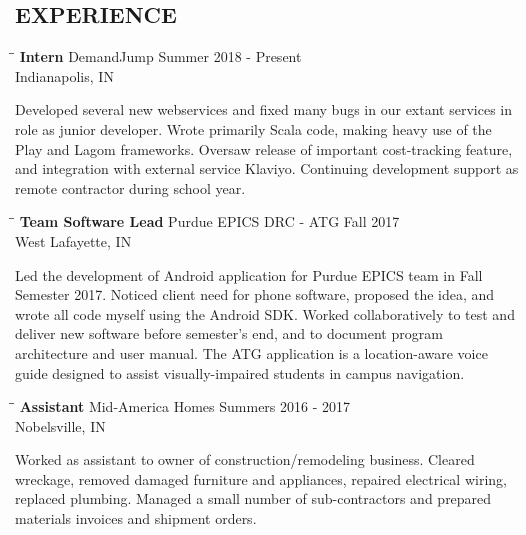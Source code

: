 \documentclass[10pt]{res}
\begin{document}
\begin{resume}
\vspace{-20pt}\section{EXPERIENCE}
   \vspace{-0.1in}	
	\begin{tabbing}
   \hspace{2.3in}\= \hspace{2.6in}\= \kill %
    {\bf Intern} \>DemandJump \>Summer 2018 - Present \\
                             \>Indianapolis, IN
   \end{tabbing}\vspace{-20pt}      %
  Developed several new webservices and fixed many bugs in our extant services in role as junior
  developer. Wrote primarily Scala code, making heavy use of the Play and Lagom frameworks. Oversaw release of important cost-tracking feature, and integration with external service
  Klaviyo. Continuing development support as remote contractor during school year.
  \vspace{-10pt}\begin{tabbing}
   \hspace{2.3in}\= \hspace{2.6in}\= \kill %
    {\bf Team Software Lead} \>Purdue EPICS DRC - ATG \>Fall 2017 \\
                             \>West Lafayette, IN
   \end{tabbing}\vspace{-20pt}      %
	Led the development of Android application for Purdue EPICS team in Fall Semester 2017. Noticed client need for phone software, proposed the idea, and wrote all code myself
	using the Android SDK. Worked collaboratively to test and deliver new software before semester's end, and to document program architecture and user manual. The ATG
	application is a location-aware voice guide designed to assist visually-impaired students in campus navigation.
	\vspace{-10pt}\begin{tabbing}
   \hspace{2.3in}\= \hspace{2.6in}\= \kill %
    {\bf Assistant} \>Mid-America Homes \>Summers 2016 - 2017 \\
                             \>Nobelsville, IN
   \end{tabbing}\vspace{-20pt}      %
	Worked as assistant to owner of construction/remodeling business. 
	Cleared wreckage, removed damaged furniture and appliances, repaired electrical wiring, replaced plumbing. 
	Managed a small number of sub-contractors and prepared materials invoices and shipment orders. 
	

\end{resume}
\end{document}
